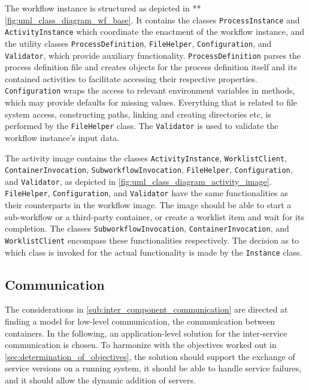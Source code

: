   The workflow instance is structured as depicted in ** \ref{fig:uml_class_diagram_wf_base}. It contains the classes \texttt{ProcessInstance} and \texttt{ActivityInstance} which coordinate the enactment of the workflow instance, and the utility classes \texttt{ProcessDefinition}, \texttt{FileHelper}, \texttt{Configuration}, and \texttt{Validator}, which provide auxiliary functionality.
  \texttt{ProcessDefinition} parses the process definition file and creates objects for the process definition itself and its contained activities to facilitate accessing their respective properties.
  \texttt{Configuration} wraps the access to relevant environment variables in methods, which may provide defaults for missing values. Everything that is related to file system access, \eg constructing paths, linking and creating directories etc, is performed by the \texttt{FileHelper} class. The \texttt{Validator} is used to validate the workflow instance's input data.

  The activity image contains the classes \texttt{ActivityInstance}, \texttt{WorklistClient}, \texttt{ContainerInvocation}, \texttt{SubworkflowInvocation}, \texttt{FileHelper}, \texttt{Configuration}, and \texttt{Validator}, as depicted in \ref{fig:uml_class_diagram_activity_image}.
  \texttt{FileHelper}, \texttt{Configuration}, and \texttt{Validator} have the same functionalities as their counterparts in the workflow image. The image should be able to start a sub-workflow or a third-party container, or create a worklist item and wait for its completion. The classes \texttt{SubworkflowInvocation}, \texttt{ContainerInvocation}, and \texttt{WorklistClient} encompass these functionalities respectively. The decision as to which class is invoked for the actual functionality is made by the \texttt{Instance} class.


\subsection{Communication} %
  \label{sub:application_level_communication}
  The considerations in \ref{sub:inter_component_communication} are directed at finding a model for low-level communication, \ie the communication between containers. In the following, an application-level solution for the inter-service communication is chosen. To harmonize with the objectives worked out in \ref{sec:determination_of_objectives}, the solution should  support the exchange of service versions on a running system, it should be able to handle service failures, and it should allow the dynamic addition of servers.


